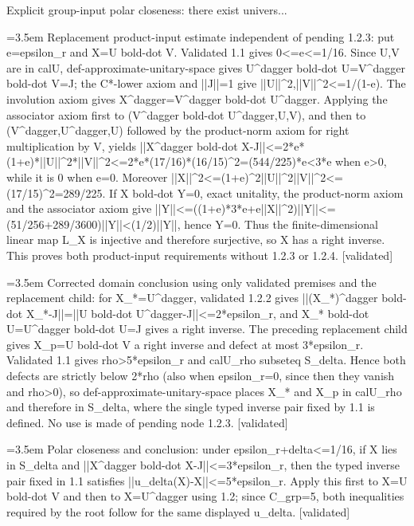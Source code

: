 \documentclass{article}
\newcommand{\step}[1]{\par\noindent\hangindent=3.5em\hangafter=1%
  \makebox[3.5em][l]{\textbf{#1.}}}
\newcommand{\steptag}[1]{\hfill{\small\textsf{[#1]}}}
\begin{document}
\begin{proofbox}{Explicit group-input polar closeness: there exist univers...}
\step{1.2.5.1.1} Replacement product-input estimate independent of pending 1.2.3: put e=epsilon\_r and X=U bold-dot V. Validated 1.1 gives 0<=e<=1/16. Since U,V are in calU, def-approximate-unitary-space gives U\textasciicircum{}dagger bold-dot U=V\textasciicircum{}dagger bold-dot V=J; the C*-lower axiom and ||J||=1 give ||U||\textasciicircum{}2,||V||\textasciicircum{}2<=1/(1-e). The involution axiom gives X\textasciicircum{}dagger=V\textasciicircum{}dagger bold-dot U\textasciicircum{}dagger. Applying the associator axiom first to (V\textasciicircum{}dagger bold-dot U\textasciicircum{}dagger,U,V), and then to (V\textasciicircum{}dagger,U\textasciicircum{}dagger,U) followed by the product-norm axiom for right multiplication by V, yields ||X\textasciicircum{}dagger bold-dot X-J||<=2*e*(1+e)*||U||\textasciicircum{}2*||V||\textasciicircum{}2<=2*e*(17/16)*(16/15)\textasciicircum{}2=(544/225)*e<3*e when e>0, while it is 0 when e=0. Moreover ||X||\textasciicircum{}2<=(1+e)\textasciicircum{}2||U||\textasciicircum{}2||V||\textasciicircum{}2<=(17/15)\textasciicircum{}2=289/225. If X bold-dot Y=0, exact unitality, the product-norm axiom and the associator axiom give ||Y||<=((1+e)*3*e+e||X||\textasciicircum{}2)||Y||<=(51/256+289/3600)||Y||<(1/2)||Y||, hence Y=0. Thus the finite-dimensional linear map L\_X is injective and therefore surjective, so X has a right inverse. This proves both product-input requirements without 1.2.3 or 1.2.4. \steptag{validated} \\[4pt]
\step{1.2.5.1.2} Corrected domain conclusion using only validated premises and the replacement child: for X\_*=U\textasciicircum{}dagger, validated 1.2.2 gives ||(X\_*)\textasciicircum{}dagger bold-dot X\_*-J||=||U bold-dot U\textasciicircum{}dagger-J||<=2*epsilon\_r, and X\_* bold-dot U=U\textasciicircum{}dagger bold-dot U=J gives a right inverse. The preceding replacement child gives X\_p=U bold-dot V a right inverse and defect at most 3*epsilon\_r. Validated 1.1 gives rho>5*epsilon\_r and calU\_rho subseteq S\_delta. Hence both defects are strictly below 2*rho (also when epsilon\_r=0, since then they vanish and rho>0), so def-approximate-unitary-space places X\_* and X\_p in calU\_rho and therefore in S\_delta, where the single typed inverse pair fixed by 1.1 is defined. No use is made of pending node 1.2.3. \steptag{validated} \\[4pt]
\step{1.3} Polar closeness and conclusion: under epsilon\_r+delta<=1/16, if X lies in S\_delta and ||X\textasciicircum{}dagger bold-dot X-J||<=3*epsilon\_r, then the typed inverse pair fixed in 1.1 satisfies ||u\_delta(X)-X||<=5*epsilon\_r. Apply this first to X=U bold-dot V and then to X=U\textasciicircum{}dagger using 1.2; since C\_grp=5, both inequalities required by the root follow for the same displayed u\_delta. \steptag{validated} \\[6pt]

\end{proofbox}
\end{document}
